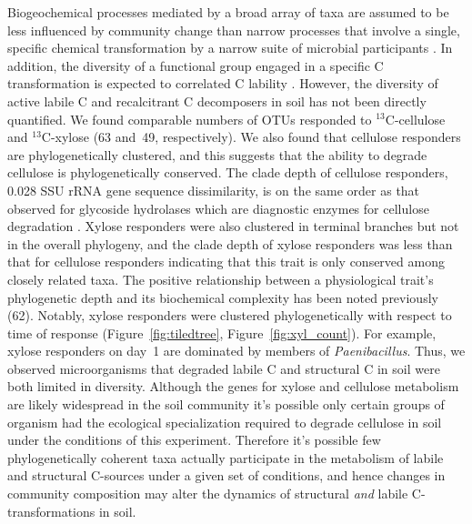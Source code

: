 Biogeochemical processes mediated by a broad array of taxa are assumed to
be less influenced by community change than narrow processes that involve
a single, specific chemical transformation by a narrow suite of microbial
participants \citep{Schimel_1995,McGuire2010}. In addition, the diversity of
a functional group engaged in a specific C transformation is expected to
correlated C lability \citep{McGuire2010}. However, the diversity of active
labile C and recalcitrant C decomposers in soil has not been directly
quantified. We found comparable numbers of OTUs responded to $^{13}$C-cellulose
and $^{13}$C-xylose (63 and~49, respectively). We also found that cellulose
responders are phylogenetically clustered, and this suggests that the ability
to degrade cellulose is phylogenetically conserved. The clade depth of
cellulose responders, 0.028 SSU rRNA gene sequence dissimilarity, is on the
same order as that observed for glycoside hydrolases which are diagnostic
enzymes for cellulose degradation \citep{Berlemont2013}. Xylose responders
were also clustered in terminal branches but not in the overall phylogeny, and
the clade depth of xylose responders was less than that for cellulose
responders indicating that this trait is only conserved among closely related
taxa. The positive relationship between a physiological trait’s phylogenetic
depth and its biochemical complexity has been noted previously (62). Notably,
xylose responders were clustered phylogenetically with respect to time of
response (Figure~\ref{fig:tiledtree}, Figure~\ref{fig:xyl_count}). For example,
xylose responders on day~1 are dominated by members of \textit{Paenibacillus}.
Thus, we observed microorganisms that degraded labile C and structural C in
soil were both limited in diversity. Although the genes for xylose and
cellulose metabolism are likely widespread in the soil community it's possible
only certain groups of organism had the ecological specialization required to
degrade cellulose in soil under the conditions of this experiment. Therefore
it's possible few phylogenetically coherent taxa actually participate in the
metabolism of labile and structural C-sources under a given set of conditions,
and hence changes in community composition may alter the dynamics of structural
\textit{and} labile C-transformations in soil.

